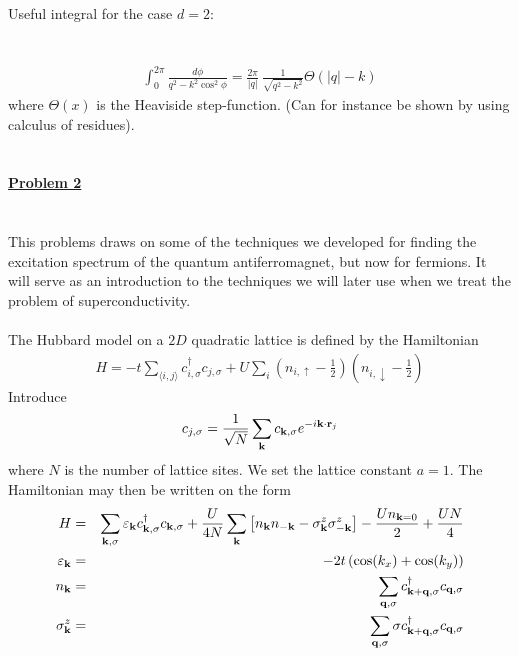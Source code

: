 \documentclass{article}
\begin{document}
 Useful integral for the case $d=2$:
 \ \\
 \ \\
 \ \\
 \begin{eqnarray}
\int_0^{2 \pi} \frac{d \phi}{q^2-k^2 \cos^2 \phi} = \frac{2 \pi}{|q|} ~ \frac{1}{\sqrt{q^2-k^2}} \Theta(|q|-k) \nonumber
 \end{eqnarray}
 where $\Theta(x)$ is the Heaviside step-function. (Can for instance be shown by using calculus of residues).  
\ \\
\ \\
\ \\
\underline{\large\bf Problem 2}\\
\ \\
\ \\
This problems draws on some of the techniques we developed for finding the excitation spectrum of the quantum antiferromagnet, but now for  fermions. It will serve as an introduction to the techniques we will later use when we treat the problem of superconductivity. 
\ \\
\ \\
The Hubbard model on a $2D$ quadratic lattice  is defined by the Hamiltonian
\begin{eqnarray}
H = -t \sum_{\langle i,j \rangle} c^{\dagger}_{i,\sigma} c_{j,\sigma} + 
U \sum_i   \left( n_{i, \uparrow} -\frac{1}{2} \right) \left(   n_{i, \downarrow}  -\frac{1}{2} \right) \nonumber
\end{eqnarray}
Introduce 
\begin{eqnarray}
c_{j,\sigma} = \frac{1}{\sqrt{N}} \sum_{{\bf k}} c_{{\bf k},\sigma} e^{- i {\bf k} \cdot {\bf r}_j} \nonumber
\end{eqnarray}
where $N$ is the number of lattice sites. We set the lattice constant $a=1$. The Hamiltonian may then be written on the form
\begin{eqnarray}
H &  = & \sum_{{\bf k},\sigma} \varepsilon_{{\bf k}} c^{\dagger}_{{\bf k},\sigma} c_{{\bf k},\sigma} + \frac{U}{4N} \sum_{{\bf k}} 
\left[ n_{\bf k}  n_{-\bf k}  - \sigma^z_{\bf k}  \sigma^z_{-\bf k}  \right]  
- \frac{U n_{{\bf k}=0}}{2} 
 +\frac{U N}{4}
\nonumber \\
\varepsilon_{{\bf k}} & = & - 2 t \left(  \cos(k_x) + \cos(k_y) \right) \nonumber  \\
n_{\bf k} & = &  \sum_{{\bf q}, \sigma} c^{\dagger}_{{\bf k} + {\bf q},\sigma}  c_{{\bf q},\sigma} \nonumber \\
\sigma^z_{\bf k} & = &  \sum_{{\bf q}, \sigma} \sigma c^{\dagger}_{{\bf k} + {\bf q},\sigma}  c_{{\bf q},\sigma} \nonumber 
\end{eqnarray} 
\end{document}

